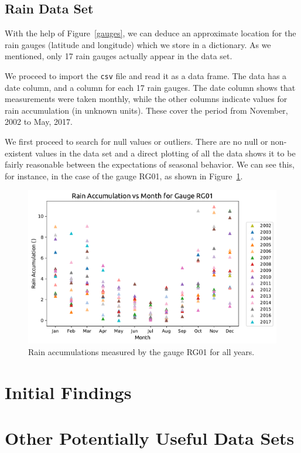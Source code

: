 \documentclass[12pt,a4paper]{article}
\begin{document}
\subsection{Rain Data Set}

With the help of Figure~\ref{gauges}, we can deduce an approximate location for the rain gauges (latitude and longitude) which we store in a dictionary. As we mentioned, only 17 rain gauges actually appear in the data set.

We proceed to import the \verb|csv| file and read it as a data frame. The data has a date column, and a column for each 17 rain gauges. The date column shows that measurements were taken monthly, while the other columns indicate values for rain accumulation (in unknown units). These cover the period from November, 2002 to May, 2017.

We first proceed to search for null values or outliers. There are no null or non-existent values in the data set and a direct plotting of all the data shows it to be fairly reasonable between the expectations of seasonal behavior. We can see this, for instance, in the case of the gauge RG01, as shown in Figure~\ref{RG01_Full}.


\begin{figure}[ht!]
\centering
\includegraphics[scale=0.6]{RG01_Full.pdf}
\caption{Rain accumulations measured by the gauge RG01 for all years.}
\label{RG01_Full}
\end{figure}








\section{Initial Findings}

\section{Other Potentially Useful Data Sets}




%

\end{document}
